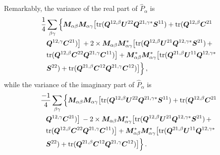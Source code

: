 \documentclass[12pt,a4paper]{article}
\begin{document}
Remarkably, the variance of the real part of $\hat{P}_\alpha$ is 
\begin{align}
\label{eq:var_in_ps_real}
    &\frac{1}{4} \sum_{\beta\gamma} 
    \Big\{\bm{M}_{\alpha\beta} \bm{M}_{\alpha\gamma} \big[ \text{tr}(\bm{Q}^{12,\beta} \bm{U}^{22} \bm{Q}^{21,\gamma*} \bm{S}^{11}) + \text{tr}(\bm{Q}^{12,\beta} \bm{C}^{21}\notag \\
    & \phantom{=} \bm{Q}^{12,\gamma} \bm{C}^{21}) \big] 
    \, + 2\times \bm{M}_{\alpha\beta} \bm{M}_{\alpha\gamma}^* \big[ \text{tr}(\bm{Q}^{12,\beta} \bm{U}^{21} \bm{Q}^{12,\gamma *} \bm{S}^{21}) \, + \notag\\
    & \phantom{=} \text{tr}(\bm{Q}^{12,\beta} \bm{C}^{22} \bm{Q}^{21,\gamma} \bm{C}^{11}) \big]  
    +\bm{M}_{\alpha\beta}^* \bm{M}_{\alpha\gamma}^* \big[ \text{tr}(\bm{Q}^{21,\beta} \bm{U}^{11} \bm{Q}^{12,\gamma*} \notag\\
    & \phantom{=} \bm{S}^{22})+ \text{tr}( \bm{Q}^{21,\beta} \bm{C}^{12} \bm{Q}^{21,\gamma} \bm{C}^{12}) \big] \Big\}\,,
\end{align}
while the variance of the imaginary part of $\hat{P}_\alpha$ is
\begin{align}
\label{eq:var_in_ps_imag}
   &\frac{-1}{4} \sum_{\beta\gamma} \Big\{ \bm{M}_{\alpha\beta} \bm{M}_{\alpha\gamma} \big[ \text{tr}(\bm{Q}^{12,\beta} \bm{U}^{22} \bm{Q}^{21,\gamma*} \bm{S}^{11}) + \text{tr}(\bm{Q}^{12,\beta} \bm{C}^{21}\notag \\
   & \phantom{=} \bm{Q}^{12,\gamma} \bm{C}^{21}) \big] 
   \, - 2 \times \bm{M}_{\alpha\beta} \bm{M}_{\alpha\gamma}^* \big[ \text{tr}(\bm{Q}^{12,\beta} \bm{U}^{21} \bm{Q}^{12,\gamma *} \bm{S}^{21}) \, + \notag\\
   & \phantom{=} \text{tr}(\bm{Q}^{12,\beta} \bm{C}^{22} \bm{Q}^{21,\gamma} \bm{C}^{11}) \big]
    +\bm{M}_{\alpha\beta}^* \bm{M}_{\alpha\gamma}^* \big[ \text{tr}(\bm{Q}^{21,\beta} \bm{U}^{11} \bm{Q}^{12,\gamma*} \notag \\
    & \phantom{=} \bm{S}^{22}) + \text{tr}( \bm{Q}^{21,\beta} \bm{C}^{12} \bm{Q}^{21,\gamma} \bm{C}^{12}) \big] \Big\} \,.
\end{align}
\end{document}
